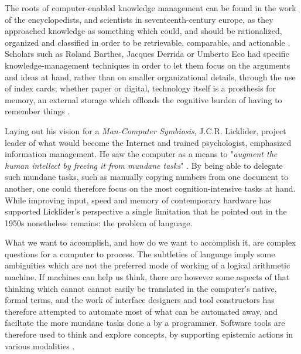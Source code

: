 The roots of computer-enabled knowledge management can be found in the work of the encyclopedists, and scientists in seventeenth-century europe, as they approached knowledge as something which could, and should be rationalized, organized and classified in order to be retrievable, comparable, and actionable \citep{sack_software_2019}. Scholars such as Roland Barthes, Jacques Derrida or Umberto Eco had specific knowledge-management techniques in order to let them focus on the arguments and ideas at hand, rather than on smaller organizational details, through the use of index cards; whether paper or digital, technology itself is a prosthesis for memory, an external storage which offloads the cognitive burden of having to remember things \citep{wilken_card_2010}.

Laying out his vision for a \emph{Man-Computer Symbiosis}, J.C.R. Licklider, project leader of what would become the Internet and trained psychologist, emphasized information management. He saw the computer as a means to "\emph{augment the human intellect by freeing it from mundane tasks}" \citep{licklider_mancomputer_1960}. By being able to delegate such mundane tasks, such as manually copying numbers from one document to another, one could therefore focus on the most cognition-intensive tasks at hand. While improving input, speed and memory of contemporary hardware has supported Licklider's perspective a single limitation that he pointed out in the 1950s nonetheless remains: the problem of language.

What we want to accomplish, and how do we want to accomplish it, are complex questions for a computer to process. The subtleties of language imply some ambiguities which are not the preferred mode of working of a logical arithmetic machine. If machines can help us think, there are however some aspects of that thinking which cannot cannot easily be translated in the computer's native, formal terms, and the work of interface designers and tool constructors has therefore attempted to automate most of what can be automated away, and faciltate the more mundane tasks done a by a programmer. Software tools are therefore used to think and explore concepts, by supporting epistemic actions in various modalities \citep{victor_humane_2014}.

